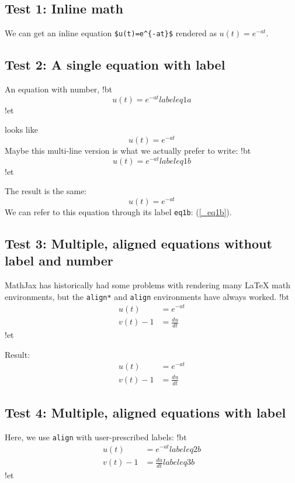 \documentclass[%
oneside,                 %
final,                   %
10pt]{article}
\begin{document}
\subsection{Test 1: Inline math}
We can get an inline equation
\Verb!$u(t)=e^{-at}$! rendered as $u(t)=e^{-at}$.
\subsection{Test 2: A single equation with label}
An equation with number,
\blatexcod
!bt
\begin{equation} u(t)=e^{-at} label{eq1a}\end{equation}
!et

\elatexcod

looks like
\begin{equation} u(t)=e^{-at} \label{_eq1a}\end{equation}
Maybe this multi-line version is what we actually prefer to write:
\blatexcod
!bt
\begin{equation}
u(t)=e^{-at}
label{eq1b}
\end{equation}
!et

\elatexcod

The result is the same:
\begin{equation}
u(t)=e^{-at} \label{_eq1b}
\end{equation}
We can refer to this equation through its label \texttt{eq1b}: (\ref{_eq1b}).
\subsection{Test 3: Multiple, aligned equations without label and number}
MathJax has historically had some problems with rendering many {\LaTeX}
math environments, but the \texttt{align*} and \texttt{align} environments have
always worked.
\blatexcod
!bt
\begin{align*}
u(t)&=e^{-at}\\ 
v(t) - 1 &= \frac{du}{dt}
\end{align*}
!et

\elatexcod

Result:
\begin{align*}
u(t)&=e^{-at}\\ 
v(t) - 1 &= \frac{du}{dt}
\end{align*}
\subsection{Test 4: Multiple, aligned equations with label}
Here, we use \texttt{align} with user-prescribed labels:
\blatexcod
!bt
\begin{align}
u(t)&=e^{-at}
label{eq2b}\\ 
v(t) - 1 &= \frac{du}{dt}
label{eq3b}
\end{align}
!et
\end{document}
